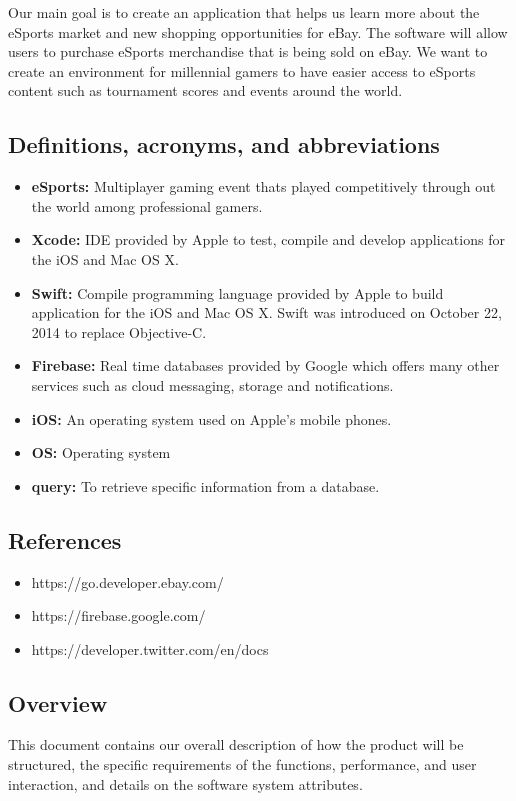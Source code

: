 \documentclass[onecolumn, draftclsnofoot,10pt, compsoc]{IEEEtran}
\begin{document}
Our main goal is to create an application that helps us learn more about the eSports market and new shopping opportunities for eBay. The software will allow users to purchase eSports merchandise that is being sold on eBay. We want to create an environment for millennial gamers to have easier access to eSports content such as tournament scores and events around the world. 

\subsection{Definitions, acronyms, and abbreviations}

\begin{itemize}
\item \textbf{eSports:} Multiplayer gaming event thats played competitively through out the world among professional gamers.
\item \textbf{Xcode:} IDE provided by Apple to test, compile and develop applications for the iOS and Mac OS X.
\item \textbf{Swift: } Compile programming language provided by Apple to build application for the iOS and Mac OS X. Swift was introduced on October 22, 2014 to replace Objective-C.
\item \textbf{Firebase: } Real time databases provided by Google which offers many other services such as cloud messaging, storage and notifications.
\item \textbf{iOS:} An operating system used on Apple's mobile phones.
\item \textbf{OS:} Operating system
\item \textbf{query:} To retrieve specific information from a database.
\end{itemize}

\subsection{References}

\begin{itemize}
\item https://go.developer.ebay.com/
\item https://firebase.google.com/
\item https://developer.twitter.com/en/docs
\end{itemize}

\subsection{Overview}
This document contains our overall description of how the product will be structured,  the specific requirements of the functions, performance, and user interaction, and details on the software system attributes.
    
\end{document}
